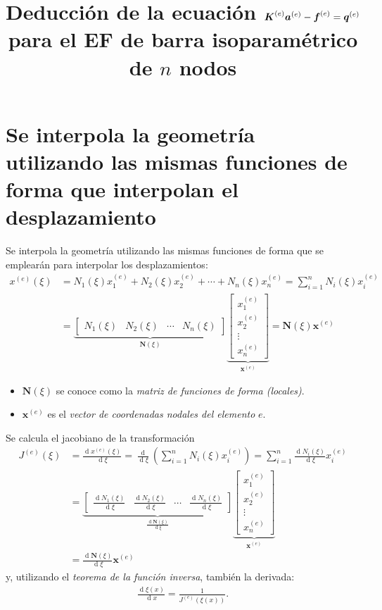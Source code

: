 \documentclass[12pt,letterpaper]{article}
\title{Deducción de la ecuación $\ma{K}^{(e)} \ve{a}^{(e)} - \ma{f}^{(e)} = \ma{q}^{(e)}$ para el EF de barra isoparamétrico de $n$ nodos}
\date{}
\newcommand{\ve}[1]{{\boldsymbol{#1}}}
\newcommand{\ma}[1]{{\boldsymbol{#1}}}
\newcommand{\dd}{\operatorname{d} \!}
\begin{document}
\maketitle

\section{Se interpola la geometría utilizando las mismas funciones de forma que interpolan el desplazamiento}

Se interpola la geometría utilizando las mismas funciones de forma que se emplearán para interpolar los desplazamientos:
\begin{align}
x^{(e)}(\xi) 
&= N_1(\xi) x_1^{(e)} + N_2(\xi) x_2^{(e)} + \cdots + N_n(\xi) x_n^{(e)} 
= \sum_{i=1}^n N_i(\xi) x_i^{(e)} \\
&= 
\underbrace{\begin{bmatrix}
    N_1(\xi) & N_2(\xi) & \cdots & N_n(\xi)
    \end{bmatrix}}_{\ma{N}(\xi)}
\underbrace{\begin{bmatrix}
    x_1^{(e)} \\ x_2^{(e)} \\ \vdots \\ x_n^{(e)}
    \end{bmatrix}}_{\ma{x}^{(e)}} = \ma{N}(\xi)  \ve{x}^{(e)}
\end{align}

\begin{itemize}
    \item $\ma{N}(\xi)$ se conoce como la \emph{matriz de funciones de forma (locales)}.
    \item $\ve{x}^{(e)}$ es el \emph{vector de coordenadas nodales del elemento} $e$.
\end{itemize}    



Se calcula el jacobiano de la transformación
\begin{align}
J^{(e)}(\xi) &= \frac{\dd x^{(e)}(\xi)}{\dd \xi} = 
\frac{\dd}{\dd \xi}\left(\sum_{i=1}^n N_i(\xi) x_i^{(e)}\right) = \sum_{i=1}^n \frac{\dd N_i(\xi)}{\dd \xi} x_i^{(e)} \\
&= 
\underbrace{\begin{bmatrix}
    \frac{\dd N_1(\xi)}{\dd \xi} & \frac{\dd N_2(\xi)}{\dd \xi} & \cdots & \frac{\dd N_n(\xi)}{\dd \xi}
    \end{bmatrix}}_{\frac{\dd \ma{N}(\xi)}{\dd \xi}}
\underbrace{\begin{bmatrix}
    x_1^{(e)} \\ x_2^{(e)} \\ \vdots \\ x_n^{(e)}
    \end{bmatrix}}_{\ma{x}^{(e)}} \\
&= \frac{\dd \ma{N}(\xi)}{\dd \xi}  \ve{x}^{(e)}
\end{align}
y, utilizando el \emph{teorema de la función inversa}, también la derivada:
\begin{align}
\frac{\dd \xi(x)}{\dd x} = \frac{1}{J^{(e)}(\xi(x))}.
\end{align}
\end{document}
